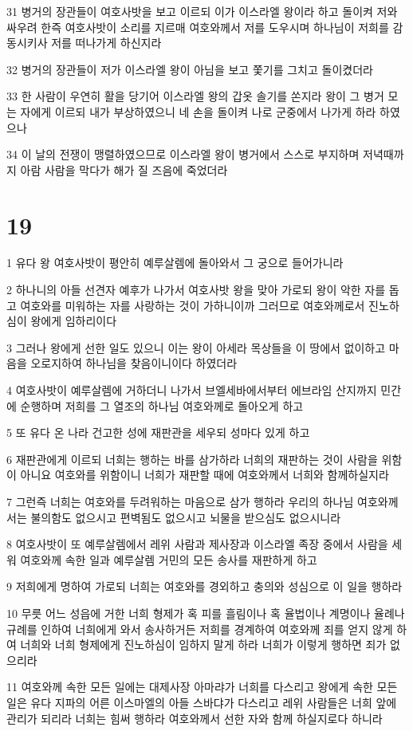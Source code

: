 \par 31 병거의 장관들이 여호사밧을 보고 이르되 이가 이스라엘 왕이라 하고 돌이켜 저와 싸우려 한즉 여호사밧이 소리를 지르매 여호와께서 저를 도우시며 하나님이 저희를 감동시키사 저를 떠나가게 하신지라
\par 32 병거의 장관들이 저가 이스라엘 왕이 아님을 보고 쫓기를 그치고 돌이켰더라
\par 33 한 사람이 우연히 활을 당기어 이스라엘 왕의 갑옷 솔기를 쏜지라 왕이 그 병거 모는 자에게 이르되 내가 부상하였으니 네 손을 돌이켜 나로 군중에서 나가게 하라 하였으나
\par 34 이 날의 전쟁이 맹렬하였으므로 이스라엘 왕이 병거에서 스스로 부지하며 저녁때까지 아람 사람을 막다가 해가 질 즈음에 죽었더라

\chapter{19}

\par 1 유다 왕 여호사밧이 평안히 예루살렘에 돌아와서 그 궁으로 들어가니라
\par 2 하나니의 아들 선견자 예후가 나가서 여호사밧 왕을 맞아 가로되 왕이 악한 자를 돕고 여호와를 미워하는 자를 사랑하는 것이 가하니이까 그러므로 여호와께로서 진노하심이 왕에게 임하리이다
\par 3 그러나 왕에게 선한 일도 있으니 이는 왕이 아세라 목상들을 이 땅에서 없이하고 마음을 오로지하여 하나님을 찾음이니이다 하였더라
\par 4 여호사밧이 예루살렘에 거하더니 나가서 브엘세바에서부터 에브라임 산지까지 민간에 순행하며 저희를 그 열조의 하나님 여호와께로 돌아오게 하고
\par 5 또 유다 온 나라 건고한 성에 재판관을 세우되 성마다 있게 하고
\par 6 재판관에게 이르되 너희는 행하는 바를 삼가하라 너희의 재판하는 것이 사람을 위함이 아니요 여호와를 위함이니 너희가 재판할 때에 여호와께서 너희와 함께하실지라
\par 7 그런즉 너희는 여호와를 두려워하는 마음으로 삼가 행하라 우리의 하나님 여호와께서는 불의함도 없으시고 편벽됨도 없으시고 뇌물을 받으심도 없으시니라
\par 8 여호사밧이 또 예루살렘에서 레위 사람과 제사장과 이스라엘 족장 중에서 사람을 세워 여호와께 속한 일과 예루살렘 거민의 모든 송사를 재판하게 하고
\par 9 저희에게 명하여 가로되 너희는 여호와를 경외하고 충의와 성심으로 이 일을 행하라
\par 10 무릇 어느 성읍에 거한 너희 형제가 혹 피를 흘림이나 혹 율법이나 계명이나 율례나 규례를 인하여 너희에게 와서 송사하거든 저희를 경계하여 여호와께 죄를 얻지 않게 하여 너희와 너희 형제에게 진노하심이 임하지 말게 하라 너희가 이렇게 행하면 죄가 없으리라
\par 11 여호와께 속한 모든 일에는 대제사장 아마랴가 너희를 다스리고 왕에게 속한 모든 일은 유다 지파의 어른 이스마엘의 아들 스바댜가 다스리고 레위 사람들은 너희 앞에 관리가 되리라 너희는 힘써 행하라 여호와께서 선한 자와 함께 하실지로다 하니라

